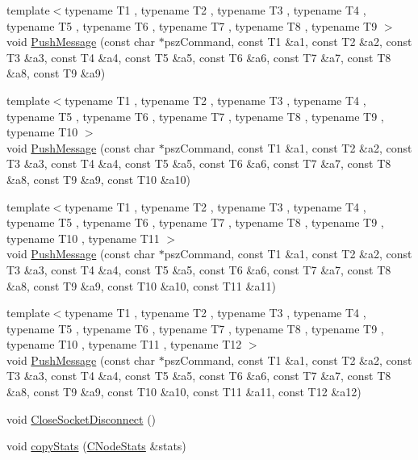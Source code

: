\begin{DoxyCompactItemize}
\item 
{\footnotesize template$<$typename T1 , typename T2 , typename T3 , typename T4 , typename T5 , typename T6 , typename T7 , typename T8 , typename T9 $>$ }\\void \mbox{\hyperlink{class_c_node_a1af04d8219e8e6aafe5b6446000cd9ff}{Push\+Message}} (const char $\ast$psz\+Command, const T1 \&a1, const T2 \&a2, const T3 \&a3, const T4 \&a4, const T5 \&a5, const T6 \&a6, const T7 \&a7, const T8 \&a8, const T9 \&a9)
\item 
{\footnotesize template$<$typename T1 , typename T2 , typename T3 , typename T4 , typename T5 , typename T6 , typename T7 , typename T8 , typename T9 , typename T10 $>$ }\\void \mbox{\hyperlink{class_c_node_a64f2ffdff9a32458d6fede8324dfd59f}{Push\+Message}} (const char $\ast$psz\+Command, const T1 \&a1, const T2 \&a2, const T3 \&a3, const T4 \&a4, const T5 \&a5, const T6 \&a6, const T7 \&a7, const T8 \&a8, const T9 \&a9, const T10 \&a10)
\item 
{\footnotesize template$<$typename T1 , typename T2 , typename T3 , typename T4 , typename T5 , typename T6 , typename T7 , typename T8 , typename T9 , typename T10 , typename T11 $>$ }\\void \mbox{\hyperlink{class_c_node_afeef78359562e34d7e62cbea4bc628fd}{Push\+Message}} (const char $\ast$psz\+Command, const T1 \&a1, const T2 \&a2, const T3 \&a3, const T4 \&a4, const T5 \&a5, const T6 \&a6, const T7 \&a7, const T8 \&a8, const T9 \&a9, const T10 \&a10, const T11 \&a11)
\item 
{\footnotesize template$<$typename T1 , typename T2 , typename T3 , typename T4 , typename T5 , typename T6 , typename T7 , typename T8 , typename T9 , typename T10 , typename T11 , typename T12 $>$ }\\void \mbox{\hyperlink{class_c_node_a9e9e15c8ba33b19041cbf2c2ffdbe9ab}{Push\+Message}} (const char $\ast$psz\+Command, const T1 \&a1, const T2 \&a2, const T3 \&a3, const T4 \&a4, const T5 \&a5, const T6 \&a6, const T7 \&a7, const T8 \&a8, const T9 \&a9, const T10 \&a10, const T11 \&a11, const T12 \&a12)
\item 
void \mbox{\hyperlink{class_c_node_a63a6091a0b0fc0987d9436e1ec708423}{Close\+Socket\+Disconnect}} ()
\item 
void \mbox{\hyperlink{class_c_node_aaa77188d9df85b80e3f8a30292acf6a9}{copy\+Stats}} (\mbox{\hyperlink{class_c_node_stats}{C\+Node\+Stats}} \&stats)
\end{DoxyCompactItemize}
